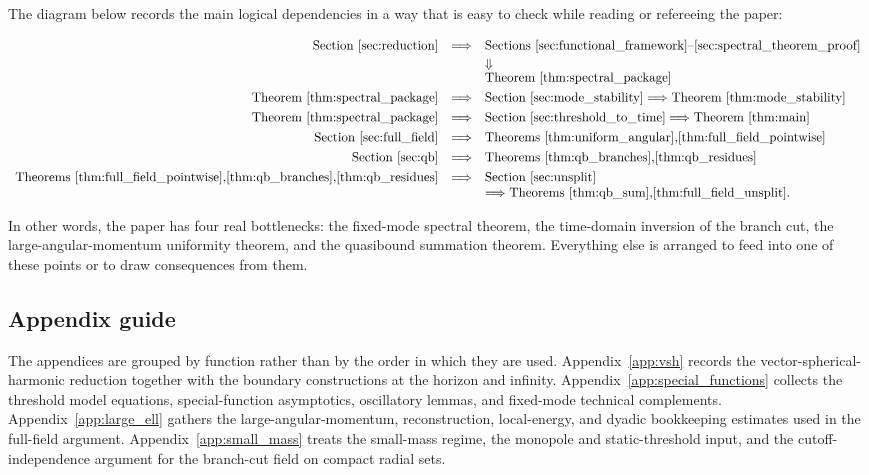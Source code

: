 \documentclass[12pt]{article}
\numberwithin{equation}{section}
\theoremstyle{plain}
\theoremstyle{definition}
\theoremstyle{remark}
\begin{document}
The diagram below records the main logical dependencies in a way that is easy to check while reading or refereeing the paper:

\begin{equation*}
\begin{array}{rcl}
\text{Section~\ref{sec:reduction}}
&\Longrightarrow&
\text{Sections~\ref{sec:functional_framework}--\ref{sec:spectral_theorem_proof}}
\\[0.5ex]
&&\Downarrow
\\[-0.3ex]
&&\text{Theorem~\ref{thm:spectral_package}}
\\[0.8ex]
\text{Theorem~\ref{thm:spectral_package}}
&\Longrightarrow&
\text{Section~\ref{sec:mode_stability}}\Longrightarrow\text{Theorem~\ref{thm:mode_stability}}
\\[0.8ex]
\text{Theorem~\ref{thm:spectral_package}}
&\Longrightarrow&
\text{Section~\ref{sec:threshold_to_time}}\Longrightarrow\text{Theorem~\ref{thm:main}}
\\[0.8ex]
\text{Section~\ref{sec:full_field}}
&\Longrightarrow&
\text{Theorems~\ref{thm:uniform_angular},\ref{thm:full_field_pointwise}}
\\[0.8ex]
\text{Section~\ref{sec:qb}}
&\Longrightarrow&
\text{Theorems~\ref{thm:qb_branches},\ref{thm:qb_residues}}
\\[0.8ex]
\text{Theorems~\ref{thm:full_field_pointwise},\ref{thm:qb_branches},\ref{thm:qb_residues}}
&\Longrightarrow&
\text{Section~\ref{sec:unsplit}}
\\
&&\Longrightarrow\text{Theorems~\ref{thm:qb_sum},\ref{thm:full_field_unsplit}}.
\end{array}
\end{equation*}


In other words, the paper has four real bottlenecks: the fixed-mode spectral theorem, the time-domain inversion of the branch cut, the large-angular-momentum uniformity theorem, and the quasibound summation theorem.  Everything else is arranged to feed into one of these points or to draw consequences from them.

\subsection{Appendix guide}

The appendices are grouped by function rather than by the order in which they are used.  Appendix~\ref{app:vsh} records the vector-spherical-harmonic reduction together with the boundary constructions at the horizon and infinity.  Appendix~\ref{app:special_functions} collects the threshold model equations, special-function asymptotics, oscillatory lemmas, and fixed-mode technical complements.  Appendix~\ref{app:large_ell} gathers the large-angular-momentum, reconstruction, local-energy, and dyadic bookkeeping estimates used in the full-field argument.  Appendix~\ref{app:small_mass} treats the small-mass regime, the monopole and static-threshold input, and the cutoff-independence argument for the branch-cut field on compact radial sets.
\end{document}
